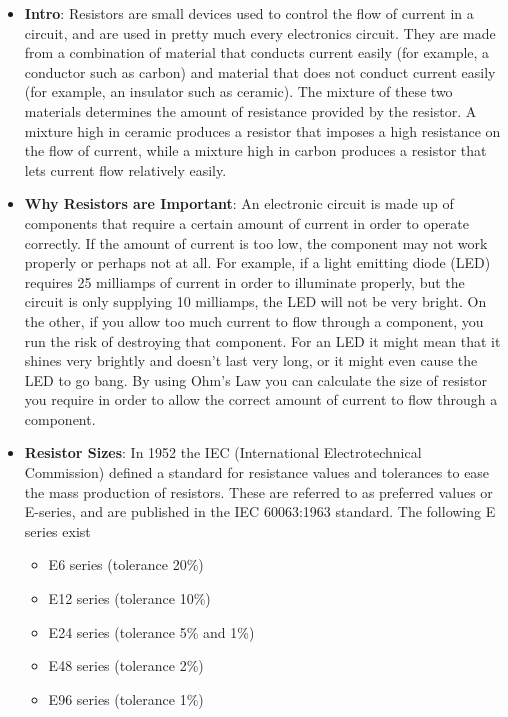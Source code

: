 \documentclass{report}
\begin{document}
    \pagebreak 
    \begin{itemize}
        \item \textbf{Intro}: Resistors are small devices used to control the flow of current in a circuit, and are used in pretty much every electronics circuit. They are made from a combination of material that conducts current easily (for example, a conductor such as carbon) and material that does not conduct current easily (for example, an insulator such as ceramic). The mixture of these two materials determines the amount of resistance provided by the resistor. A mixture high in ceramic produces a resistor that imposes a high resistance on the flow of current, while a mixture high in carbon produces a resistor that lets current flow relatively easily.        
        \item \textbf{Why Resistors are Important}: An electronic circuit is made up of components that require a certain amount of current in order to operate correctly. If the amount of current is too low, the component may not work properly or perhaps not at all. For example, if a light emitting diode (LED) requires 25 milliamps of current in order to illuminate properly, but the circuit is only supplying 10 milliamps, the LED will not be very bright. On the other, if you allow too much current to flow through a component, you run the risk of destroying that component. For an LED it might mean that it shines very brightly and doesn't last very long, or it might even cause the LED to go bang.
            \bigbreak \noindent 
            By using Ohm's Law you can calculate the size of resistor you require in order to allow the correct amount of current to flow through a component.
        \item \textbf{Resistor Sizes}: In 1952 the IEC (International Electrotechnical Commission) defined a standard for resistance values and tolerances to ease the mass production of resistors. These are referred to as preferred values or E-series, and are published in the IEC 60063:1963 standard.
            \bigbreak \noindent 
            The following E series exist
            \begin{itemize}
                \item E6 series (tolerance 20\%)
                \item E12 series (tolerance 10\%)
                \item E24 series (tolerance 5\% and 1\%)
                \item E48 series (tolerance 2\%)
                \item E96 series (tolerance 1\%)

\end{itemize}
\end{itemize}
\end{document}
